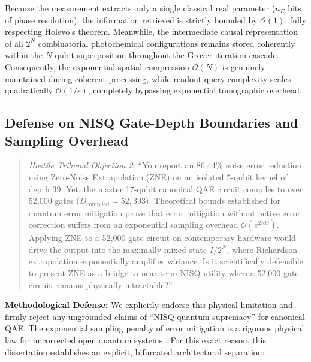 Because the measurement extracts only a single classical real parameter ($n_E$ bits of phase resolution), the information retrieved is strictly bounded by $\mathcal{O}(1)$, fully respecting Holevo's theorem. Meanwhile, the intermediate causal representation of all $2^N$ combinatorial photochemical configurations remains stored coherently within the $N$-qubit superposition throughout the Grover iteration cascade. Consequently, the exponential spatial compression $\mathcal{O}(N)$ is genuinely maintained during coherent processing, while readout query complexity scales quadratically $\mathcal{O}(1/\epsilon)$, completely bypassing exponential tomographic overhead.

\subsection{Defense on NISQ Gate-Depth Boundaries and Sampling Overhead}
\begin{quote}
\emph{Hostile Tribunal Objection 2:} ``You report an $86.44\%$ noise error reduction using Zero-Noise Extrapolation (ZNE) on an isolated 5-qubit kernel of depth 39. Yet, the master 17-qubit canonical QAE circuit compiles to over 52,000 gates ($D_{\mathrm{compiled}} = 52,393$). Theoretical bounds established for quantum error mitigation \cite{temme2017, endo2018} prove that error mitigation without active error correction suffers from an exponential sampling overhead $\mathcal{O}(e^{2 \gamma D})$. Applying ZNE to a 52,000-gate circuit on contemporary hardware would drive the output into the maximally mixed state $I/2^N$, where Richardson extrapolation exponentially amplifies variance. Is it scientifically defensible to present ZNE as a bridge to near-term NISQ utility when a 52,000-gate circuit remains physically intractable?''
\end{quote}
\textbf{Methodological Defense:} We explicitly endorse this physical limitation and firmly reject any ungrounded claims of ``NISQ quantum supremacy'' for canonical QAE. The exponential sampling penalty of error mitigation is a rigorous physical law for uncorrected open quantum systems \cite{temme2017, endo2018, preskill2018}. For this exact reason, this dissertation establishes an explicit, bifurcated architectural separation:
